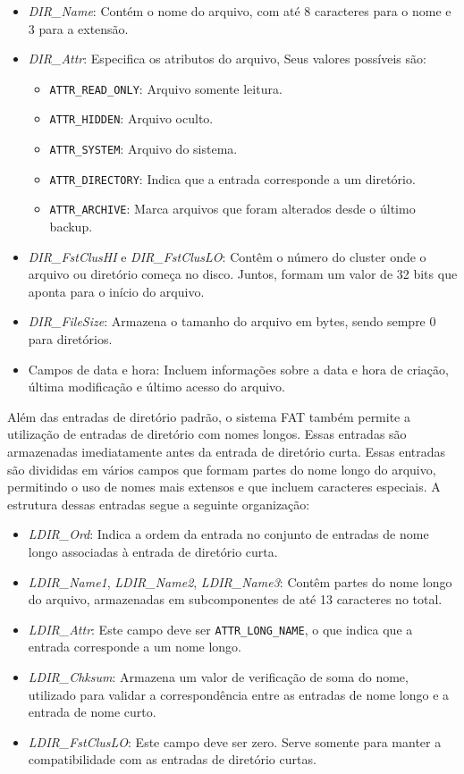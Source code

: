\documentclass[
    12pt,				%
    oneside,   	        %
    a4paper,			%
    english,			%
    french,				%
    spanish,			%
    brazil,				%
    ]{pacotes/abntex2}
\begin{document}
\begin{itemize} 
    \item \textit{DIR\_Name}: Contém o nome do arquivo, com até 8 caracteres para o nome e 3 para a extensão.
    \item \textit{DIR\_Attr}: Especifica os atributos do arquivo, Seus valores possíveis são:
    \begin{itemize} 
        \item \texttt{ATTR\_READ\_ONLY}: Arquivo somente leitura.
        \item \texttt{ATTR\_HIDDEN}: Arquivo oculto.
        \item \texttt{ATTR\_SYSTEM}: Arquivo do sistema.
        \item \texttt{ATTR\_DIRECTORY}: Indica que a entrada corresponde a um diretório.
        \item \texttt{ATTR\_ARCHIVE}: Marca arquivos que foram  alterados desde o último backup.
    \end{itemize}
    \item \textit{DIR\_FstClusHI} e \textit{DIR\_FstClusLO}: Contêm o número do cluster onde o arquivo ou diretório começa no disco. Juntos, formam um valor de 32 bits que aponta para o início do arquivo. 
    \item \textit{DIR\_FileSize}: Armazena o tamanho do arquivo em bytes, sendo sempre 0 para diretórios. 
    \item Campos de data e hora: Incluem informações sobre a data e hora de criação, última modificação e último acesso do arquivo.
\end{itemize}

Além das entradas de diretório padrão, o sistema FAT também permite a utilização de entradas de diretório com nomes longos. Essas entradas são armazenadas imediatamente antes da entrada de diretório curta. Essas entradas são divididas em vários campos que formam partes do nome longo do arquivo, permitindo o uso de nomes mais extensos e que incluem caracteres especiais. A estrutura dessas entradas segue a seguinte organização:

\begin{itemize} 
    \item \textit{LDIR\_Ord}: Indica a ordem da entrada no conjunto de entradas de nome longo associadas à entrada de diretório curta.
    \item \textit{LDIR\_Name1}, \textit{LDIR\_Name2}, \textit{LDIR\_Name3}: Contêm partes do nome longo do arquivo, armazenadas em subcomponentes de até 13 caracteres no total.
    \item \textit{LDIR\_Attr}: Este campo deve ser \texttt{ATTR\_LONG\_NAME}, o que indica que a entrada corresponde a um nome longo.
    \item \textit{LDIR\_Chksum}: Armazena um valor de verificação de soma do nome, utilizado para validar a correspondência entre as entradas de nome longo e a entrada de nome curto.
    \item \textit{LDIR\_FstClusLO}: Este campo deve ser zero. Serve somente para manter a compatibilidade com as entradas de diretório curtas.
\end{itemize}
\end{document}
